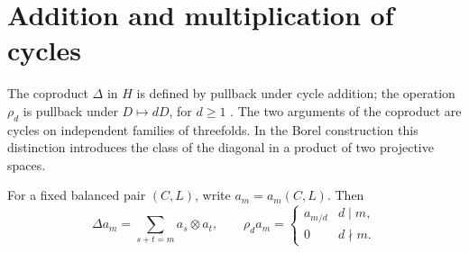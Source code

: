 \section{Addition and multiplication of cycles}\label{sec:operations}

The coproduct $\Delta$ in $H$ is defined by pullback under cycle
addition; the operation $\rho_d$ is pullback under $D\mapsto dD$,
for $d\geq1$ \cite[Definitions~3.9 and~3.12]{Pardon}. The two
arguments of the coproduct are cycles on independent families of
threefolds. In the Borel construction this distinction introduces
the class of the diagonal in a product of two projective spaces.

\begin{proposition}\label{prop:operations}
For a fixed balanced pair $(C,L)$, write $a_m=a_m(C,L)$. Then
\begin{equation}\label{eq:operations}
 \Delta a_m=\sum_{s+t=m}a_s\otimes a_t,\qquad
 \rho_d a_m=
 \begin{cases}a_{m/d}&d\mid m,\\0&d\nmid m.\end{cases}
\end{equation}
\end{proposition}

